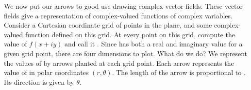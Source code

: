 %
%
%
%
%
%


We now put our arrows to good use drawing complex vector fields.
These vector fields give a representation of complex-valued
functions of complex variables.
Consider a Cartesian coordinate grid of points  in
the plane, and some complex-valued function  defined on
this grid.
At every point on this grid, compute the value of
$f(x + iy)$ and call it .
Since  has both a real and imaginary value for a given
 grid point, there are four dimensions to plot.
What do we do?
We represent the values of  by arrows planted at each
grid point.
Each arrow represents the value of  in polar coordinates
$(r,\theta)$.
The length of the arrow is proportional to .
Its direction is given by $\theta$.


